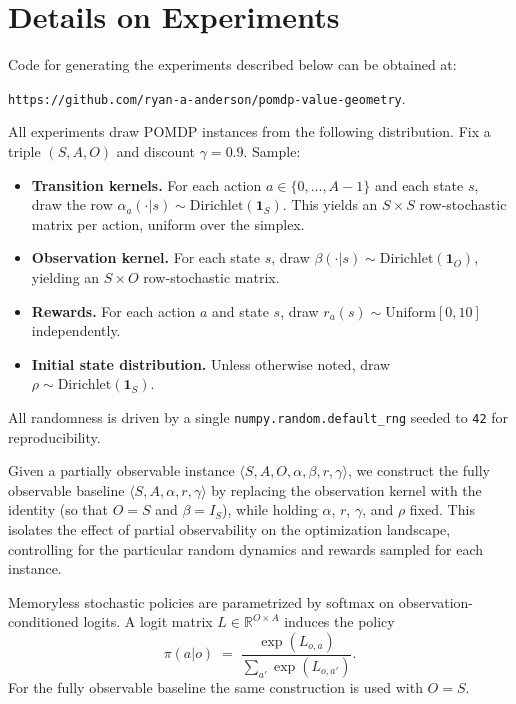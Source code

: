 \documentclass{article}
\theoremstyle{definition}
\theoremstyle{remark}
\begin{document}
\newpage
\section{Details on Experiments} 
\label{app:details-experi}

Code for generating the experiments described below can be obtained at: 

\texttt{https://github.com/ryan-a-anderson/pomdp-value-geometry}. 


All experiments draw POMDP instances from the following distribution. Fix a triple $(S, A, O)$ and discount $\gamma = 0.9$. Sample:
 
\begin{itemize}
  \item \textbf{Transition kernels.} For each action $a \in \{0, \dots, A-1\}$
        and each state $s$, draw the row
        $\alpha_a(\cdot  |  s) \sim \mathrm{Dirichlet}(\mathbf{1}_S)$.
        This yields an $S \times S$ row-stochastic matrix per action, uniform
        over the simplex.
 
  \item \textbf{Observation kernel.} For each state $s$, draw
        $\beta(\cdot  |  s) \sim \mathrm{Dirichlet}(\mathbf{1}_O)$, yielding
        an $S \times O$ row-stochastic matrix.
 
  \item \textbf{Rewards.} For each action $a$ and state $s$, draw
        $r_a(s) \sim \mathrm{Uniform}[0, 10]$ independently.
 
  \item \textbf{Initial state distribution.} Unless otherwise noted, draw
        $\rho \sim \mathrm{Dirichlet}(\mathbf{1}_S)$.
\end{itemize}
 
All randomness is driven by a single \texttt{numpy.random.default\_rng} seeded to \texttt{42} for reproducibility.

Given a partially observable instance $\langle S, A, O, \alpha, \beta, r, \gamma \rangle$, we construct the fully observable baseline $\langle S, A, \alpha, r, \gamma \rangle$ by replacing the observation kernel with the identity (so that $O = S$ and $\beta = I_S$), while holding $\alpha$, $r$, $\gamma$, and $\rho$ fixed. This isolates the effect of partial observability on the optimization landscape, controlling for the particular random dynamics and rewards sampled for each instance.
 
Memoryless stochastic policies are parametrized by softmax on observation-conditioned logits. A logit matrix $L \in \mathbb{R}^{O \times A}$ induces the policy
\[
  \pi(a | o) \;=\; \frac{\exp(L_{o,a})}{\sum_{a'} \exp(L_{o,a'})}.
\]
For the fully observable baseline the same construction is used with $O = S$.
 
\end{document}
